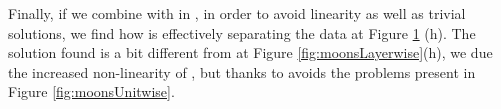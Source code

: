 \begin{figure}
{{    %
    }
    \parbox{.195\textwidth}{%
    }
  }

    \caption{\SepPointUnit}
    \label{fig:moonsUnitpointwise}
\end{figure}

Finally, if we combine \SepPoint with \SepPoint in \SepPointUnit, in order to avoid linearity as well as trivial solutions, we find how is effectively separating the data at Figure \ref{fig:moonsUnitpointwise} (h). The solution found is a bit different from \SepLayer at Figure \ref{fig:moonsLayerwise}(h), we due the increased non-linearity of \SepUnit, but thanks to \SepPoint avoids the problems present in Figure \ref{fig:moonsUnitwise}.

